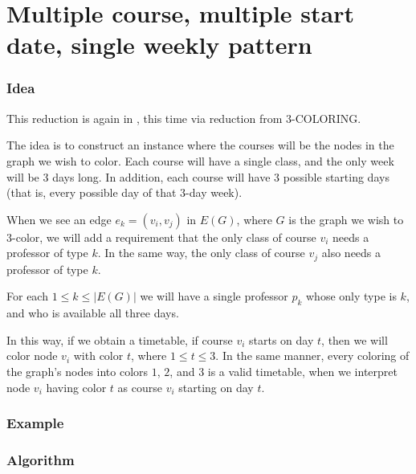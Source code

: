 \section{Multiple course, multiple start date, single weekly pattern}
\subsubsection{Idea}
This reduction is again in \npc, this time via reduction from 3-COLORING.

The idea is to construct an instance where the courses will be the nodes in the graph we wish to color. Each course will have a single class, and the only week will be 3 days long. In addition, each course will have 3 possible starting days (that is, every possible day of that 3-day week).

When we see an edge $e_k = (v_i, v_j)$ in $E(G)$, where $G$ is the graph we wish to 3-color, we will add a requirement that the only class of course $v_i$ needs a professor of type $k$. In the same way, the only class of course $v_j$ also needs a professor of type $k$.

For each $1 \le k \le |E(G)|$ we will have a single professor $p_k$ whose only type is $k$, and who is available all three days.

In this way, if we obtain a timetable, if course $v_i$ starts on day $t$, then we will color node $v_i$ with color $t$, where $1 \le t \le 3$. In the same manner, every coloring of the graph's nodes into colors $1$, $2$, and $3$ is a valid timetable, when we interpret node $v_i$ having color $t$ as course $v_i$ starting on day $t$.

\subsubsection{Example}

\subsubsection{Algorithm}
